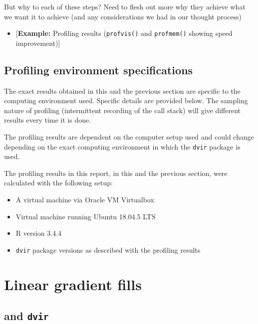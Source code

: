 \documentclass[]{article}
\providecommand{\tightlist}{%
  \setlength{\itemsep}{0pt}\setlength{\parskip}{0pt}}
\begin{document}
But why to each of these steps? Need to flesh out more why they achieve
what we want it to achieve (and any considerations we had in our thought
process)

\begin{itemize}
\tightlist
\item
  {[}\textbf{Example:} Profiling results (\texttt{profvis()} and
  \texttt{profmem()} showing speed improvement){]}
\end{itemize}

\subsection{Profiling environment
specifications}\label{profiling-environment-specifications}

The exact results obtained in this and the previous section are specific
to the computing environment used. Specific details are provided below.
The sampling nature of profiling (intermittent recording of the call
stack) will give different results every time it is done.

The profiling results are dependent on the computer setup used and could
change depending on the exact computing environment in which the
\texttt{dvir} package is used.

The profiling results in this report, in this and the previous section,
were calculated with the following setup:

\begin{itemize}
\tightlist
\item
  A virtual machine via Oracle VM Virtualbox
\item
  Virtual machine running Ubuntu 18.04.5 LTS
\item
  R version 3.4.4
\item
  \texttt{dvir} package versions as described with the profiling results
\end{itemize}

\newpage{}

\section{Linear gradient fills}\label{linear-gradient-fills}

\subsection{\texorpdfstring{\Tikz{} and
\texttt{dvir}}{ and dvir}}\label{and-dvir}
\end{document}
